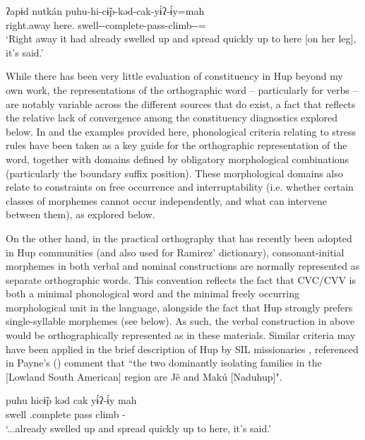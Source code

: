 \documentclass[output=paper]{langscibook}
\begin{document}
\ea\label{ex:hup:key:1}
\gll ʔapɨd  nutkán puhu-hi-cɨ̃p-kǝd-cak-yɨ́ʔ-ɨ́y=mah \\ 
right.away here.\Dir{} swell-\Fact{}-complete-pass-climb-\Tel{}-\Dynm{}=\Rep{} \\ 
\glt `Right away it had already swelled up and spread quickly up to here [on her leg], it's said.' 
\z 


While there has been very little evaluation of constituency in Hup beyond my own work, the representations of the orthographic word – particularly for verbs – are notably variable across the different sources that do exist, a fact that reflects the relative lack of convergence among the constituency diagnostics explored below. In \citet{Epps2008} and the examples provided here, phonological criteria relating to stress rules have been taken as a key guide for the orthographic representation of the word, together with domains defined by obligatory morphological combinations (particularly the boundary suffix position). These morphological domains also relate to constraints on free occurrence and interruptability (i.e. whether certain classes of morphemes cannot occur independently, and what can intervene between them), as explored below. 

On the other hand, in the practical orthography that has recently been adopted in Hup communities (and also used for Ramirez' \citeyear{Ramirez2006} dictionary), consonant-initial morphemes in both verbal and nominal constructions are normally represented as separate orthographic words. This convention reflects the fact that CVC/CVV is both a minimal phonological word and the minimal freely occurring morphological unit in the language, alongside the fact that Hup strongly prefers single-syllable morphemes (see  below). As such, the verbal construction in  above would be orthographically represented as  in these materials. Similar criteria may have been applied in the brief description of Hup by SIL missionaries \citet{Moore1980}, referenced in Payne's (\citeyear[219]{Payne1990}) comment that ``the two dominantly isolating families in the [Lowland South American] region are Jê and Makú [Naduhup]".

\ea\label{ex:hup:key:2}
\gll puhu hicɨ̃p kǝd cak yɨ́ʔ-ɨ́y mah \\ 
swell \Fact{}.complete pass climb \Tel-\Dynm{} \Rep{} \\ 
\glt `...already swelled up and spread quickly up to here, it's said.' 
\z 
\end{document}
